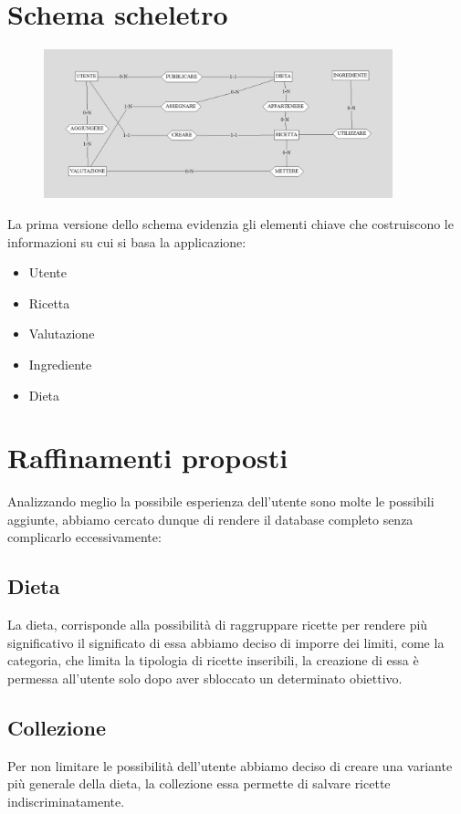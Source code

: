 ﻿\documentclass[a4paper,12pt]{report}
\begin{document}
\section{Schema scheletro}
\begin{figure}[H]
    \centering
   \includegraphics[width=0.9\textwidth]{app_images/schema-scheletro.png}  
    \label{fig:example}
\end{figure}
La prima versione dello schema evidenzia gli elementi chiave 
che costruiscono le informazioni su cui si basa la applicazione:
\begin{itemize}
    \item Utente
    \item Ricetta
    \item Valutazione
    \item Ingrediente
    \item Dieta
\end{itemize}

\section{Raffinamenti proposti}
Analizzando meglio la possibile esperienza dell'utente
sono molte le possibili aggiunte, abbiamo cercato
dunque di rendere il database completo senza complicarlo eccessivamente:
\subsection{Dieta}
La dieta, corrisponde alla possibilità di raggruppare ricette
per rendere più significativo il significato di essa abbiamo deciso di 
imporre dei limiti, come la categoria, che limita la tipologia di ricette 
inseribili, la creazione di essa è permessa all'utente solo dopo aver sbloccato un determinato obiettivo.
\subsection{Collezione}
Per non limitare le possibilità dell'utente abbiamo deciso di creare 
una variante più generale della dieta, la collezione
essa permette di salvare ricette indiscriminatamente.
\end{document}
